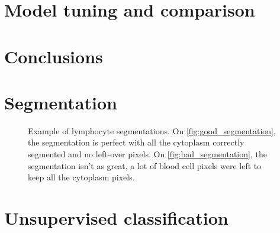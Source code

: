 \documentclass{midl}
\begin{document}
\section{Model tuning and comparison}
\label{sec:evaluation}

\section{Conclusions}
\label{sec:conclusion}

\newpage


\appendix

\section{Segmentation}

\begin{figure}[H]
    \centering
    {
         \qquad
    }
    {\caption{Example of lymphocyte segmentations. On \ref{fig:good_segmentation}, the segmentation is perfect with all the cytoplasm correctly segmented and no left-over pixels. On \ref{fig:bad_segmentation}, the segmentation isn't as great, a lot of blood cell pixels were left to keep all the cytoplasm pixels.\label{fig:segmentation}}}
\end{figure}

\section{Unsupervised classification}
\end{document}
